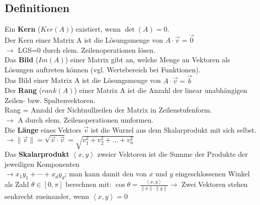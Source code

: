 \subsection{Definitionen}

Ein \textbf{Kern} (\(Ker(A)\)) existiert, wenn \(\det(A) = 0\).\\
Der Kern einer Matrix A ist die Lösungsmenge von \(A \cdot \vec{v} = \vec{0}\)\\
\(\rightarrow\) LGS=0 durch elem. Zeilenoperationen lösen.\\

Das \textbf{Bild} (\(Im(A)\)) einer Matrix gibt an, welche Menge an Vektoren als Lösungen auftreten können (vgl. Wertebereich bei Funktionen).\\
Das Bild einer Matrix A ist die Lösungsmenge von \(A \cdot \vec{v} = \vec{b}\)\\


Der \textbf{Rang} (\(rank(A)\)) einer Matrix A ist die Anzahl der linear unabhängigen Zeilen- bzw. Spaltenvektoren.\\
Rang = Anzahl der Nichtnullzeilen der Matrix in Zeilenstufenform.\\
\(\rightarrow\) A durch elem. Zeilenoperationen umformen.\\

Die \textbf{Länge} eines Vektors \(\vec{v}\) ist die Wurzel aus dem Skalarprodukt mit sich selbst.\\
\(\rightarrow \|\vec{v}\| = \sqrt{\vec{v} \cdot \vec{v}} = \sqrt{v_1^2 + v_2^2 + \dots + v_n^2}\)\\

Das \textbf{Skalarprodukt} \(\left\langle x, y\right\rangle \) zweier Vektoren ist die Summe der Produkte der jeweiligen Komponenten\\
\(\rightarrow x_1y_1+\cdots + x_dy_d\); man kann damit den von \(x\) und \(y\) eingeschlossenen Winkel als Zahl \(\theta \in [0,\pi]\) berechnen mit: \(\cos \theta = \frac{\left\langle x, y\right\rangle}{\|x\|\cdot \|y\|} \rightarrow\) Zwei Vektoren stehen senkrecht zueinander, wenn \(\left\langle x, y\right\rangle = 0\)\\